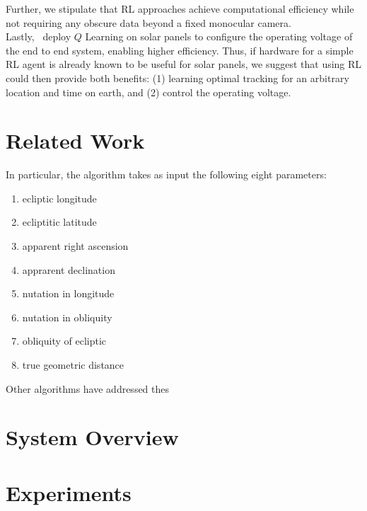 \documentclass[11pt]{article}
\begin{document}
Further, we stipulate that RL approaches achieve computational efficiency while not requiring any obscure data beyond a fixed monocular camera. \\

Lastly,~\citet{Hsu2015} deploy $Q$ Learning on solar panels to configure the operating voltage of the end to end system, enabling higher efficiency. Thus, if hardware for a simple RL agent is already known to be useful for solar panels, we suggest that using RL could then provide both benefits: (1) learning optimal tracking for an arbitrary location and time on earth, and (2) control the operating voltage. \\



\section{Related Work}


In particular, the algorithm takes as input the following eight parameters:
\begin{enumerate}
\item ecliptic longitude
\item ecliptitic latitude
\item apparent right ascension
\item apprarent declination
\item nutation in longitude
\item nutation in obliquity
\item obliquity of ecliptic
\item true geometric distance
\end{enumerate}

Other algorithms have addressed thes




\section{System Overview}



\section{Experiments}
\end{document}

